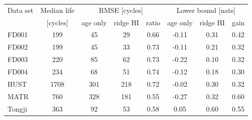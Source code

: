 \begin{tabular}{l c c c c c c c}
\hline
Data set & Median life & \multicolumn{3}{c}{RMSE [cycles]} & \multicolumn{3}{c}{Lower bound [nats]} \\
 & [cycles] & age only & ridge HI & ratio & age only & ridge HI & gain \\
\hline
FD001 & 199 & 45 & 29 & 0.66 & -0.11 & 0.31 & 0.42 \\
FD002 & 199 & 45 & 33 & 0.73 & -0.11 & 0.21 & 0.32 \\
FD003 & 220 & 85 & 62 & 0.73 & -0.22 & 0.10 & 0.32 \\
FD004 & 234 & 68 & 51 & 0.74 & -0.12 & 0.18 & 0.30 \\
HUST & 1708 & 301 & 218 & 0.72 & -0.02 & 0.30 & 0.32 \\
MATR & 760 & 328 & 181 & 0.55 & -0.27 & 0.32 & 0.60 \\
Tongji & 363 & 92 & 53 & 0.58 & 0.05 & 0.60 & 0.55 \\
\hline
\end{tabular}
